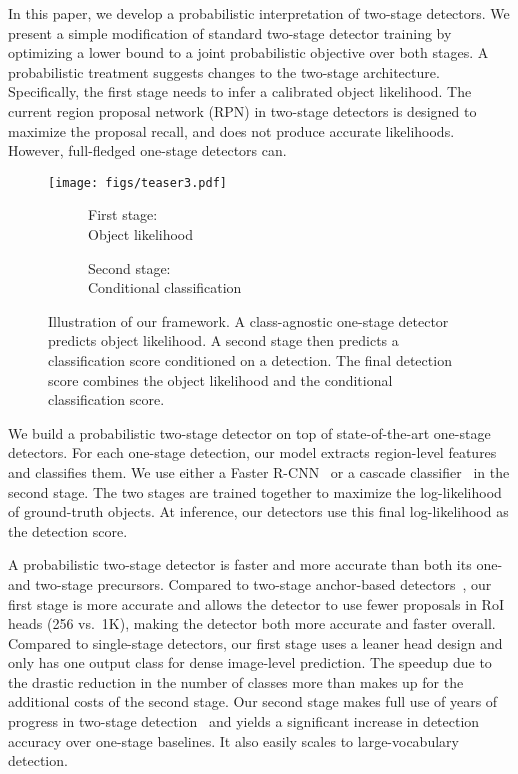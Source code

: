 \documentclass{article}
\begin{document}
In this paper, we develop a probabilistic interpretation of two-stage detectors.
We present a simple modification of standard two-stage detector training by optimizing a lower bound to a joint probabilistic objective over both stages.
A probabilistic treatment suggests changes to the two-stage architecture.
Specifically, the first stage needs to infer a calibrated object likelihood.
The current region proposal network (RPN) in two-stage detectors is designed to maximize the proposal recall, and does not produce accurate likelihoods.
However, full-fledged one-stage detectors can.

\begin{figure}[t]
\begin{center}
\texttt{[image: figs/teaser3.pdf]}
   \begin{subfigure}[b]{0.5\linewidth}\caption{First stage:\\Object likelihood}\label{fig:teaser_fs}\end{subfigure}\begin{subfigure}[b]{0.5\linewidth}\caption{Second stage: \\Conditional classification}\label{fig:teaser_ss}\end{subfigure}\end{center}
\vspace{-5mm}
   \caption{
   Illustration of our framework. A class-agnostic one-stage detector predicts object likelihood. A second stage then predicts a classification score conditioned on a detection.
   The final detection score combines the object likelihood and the conditional classification score.
   }
\vspace{-6mm}
\label{fig:framework}
\end{figure}

We build a probabilistic two-stage detector on top of state-of-the-art one-stage detectors.
For each one-stage detection, our model extracts region-level features and classifies them.
We use either a 
Faster R-CNN~\cite{ren2015faster} or a cascade classifier~\cite{cai2018cascade} in the second stage.
The two stages are trained together to maximize the log-likelihood of ground-truth objects.
At inference, our detectors use this final log-likelihood as the detection score.


A probabilistic two-stage detector is faster and more accurate than both its one- and two-stage precursors.
Compared to two-stage anchor-based detectors~\cite{cai2018cascade}, our first stage is more accurate and allows the detector to use fewer proposals in RoI heads (256 vs.\ 1K), making the detector both more accurate and faster overall.
Compared to single-stage detectors, our first stage uses a leaner head design and only has one output class for dense image-level prediction.
The speedup due to the drastic reduction in the number of classes more than makes up for the additional costs of the second stage.
Our second stage makes full use of years of progress in two-stage detection~\cite{cai2018cascade,chen2019hybrid} and yields a significant increase in detection accuracy over one-stage baselines.
It also easily scales to large-vocabulary detection.
\end{document}
